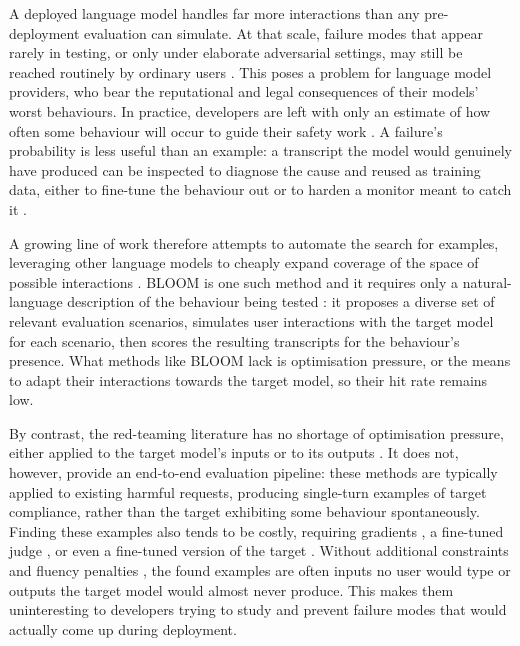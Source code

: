 \documentclass{article}
\begin{document}
A deployed language model handles far more interactions than any pre-deployment evaluation can simulate. At that scale, failure modes that appear rarely in testing, or only under elaborate adversarial settings, may still be reached routinely by ordinary users \citep{jones2025forecasting}.
This poses a problem for language model providers, who bear the reputational and legal consequences of their models' worst behaviours.
In practice, developers are left with only an estimate of how often some behaviour will occur to guide their safety work \citep{scholten2024probabilistic,wu2024rare,angell2026tail}. A failure's probability is less useful than an example: a transcript the model would genuinely have produced can be inspected to diagnose the cause and reused as training data, either to fine-tune the behaviour out or to harden a monitor meant to catch it  \citep{sheshadri2025latentadversarialtrainingimproves, sharma2025constitutional}.

A growing line of work therefore attempts to automate the search for examples, leveraging other language models to cheaply expand coverage of the space of possible interactions \citep{perez2022redteaming,brown2025task,feng2025dataswarms,huang2025multiturn}.
BLOOM is one such method and it requires only a natural-language description of the behaviour being tested \citep{gupta2025bloom}: it proposes a diverse set of relevant evaluation scenarios, simulates user interactions with the target model for each scenario, then scores the resulting transcripts for the behaviour's presence.
What methods like BLOOM lack is optimisation pressure, or the means to adapt their interactions towards the target model, so their hit rate remains low.

By contrast, the red-teaming literature has no shortage of optimisation pressure, either applied to the target model's inputs \citep{sadasivan2024fast,chao2023jailbreaking} or to its outputs \citep{zhao2024weak,zhou2024emulated}.
It does not, however, provide an end-to-end evaluation pipeline: these methods are typically applied to existing harmful requests, producing single-turn examples of target compliance, rather than the target exhibiting some behaviour spontaneously.
Finding these examples also tends to be costly, requiring gradients \citep{zou2023universal}, a fine-tuned judge \citep{mazeika2024harmbench}, or even a fine-tuned version of the target \citep{thompson2024flrt}.
Without additional constraints and fluency penalties \citep{thompson2024flrt}, the found examples are often inputs no user would type or outputs the target model would almost never produce. This makes them uninteresting to developers trying to study and prevent failure modes that would actually come up during deployment.
\end{document}
